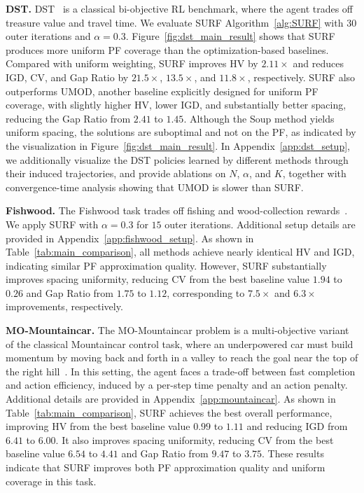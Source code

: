 \documentclass{article}
\begin{document}
\textbf{DST.}
DST~\citep{vamplew2011empirical,yahyaa2015thompson} is a classical bi-objective RL benchmark, where the agent trades off treasure value and travel time. 
We evaluate SURF Algorithm~\ref{alg:SURF} with $30$ outer iterations and $\alpha=0.3$. 
Figure~\ref{fig:dst_main_result} shows that SURF produces more uniform PF coverage than the optimization-based baselines. 
Compared with uniform weighting, SURF improves HV by $2.11\times$ and reduces IGD, CV, and Gap Ratio by $21.5\times$, $13.5\times$, and $11.8\times$, respectively. 
SURF also outperforms UMOD, another baseline explicitly designed for uniform PF coverage, with slightly higher HV, lower IGD, and substantially better spacing, reducing the Gap Ratio from $2.41$ to $1.45$. 
Although the Soup method yields uniform spacing,  the solutions are suboptimal and not on the PF, as indicated by the visualization in Figure~\ref{fig:dst_main_result}.
In Appendix~\ref{app:dst_setup}, we additionally visualize the DST policies learned by different methods through their induced trajectories, and provide ablations on $N$, $\alpha$, and $K$, together with convergence-time analysis showing that UMOD is slower than SURF.

\textbf{Fishwood.} The Fishwood task trades off fishing and wood-collection rewards~\citep{roijers2018multi}. We apply SURF with $\alpha=0.3$ for $15$ outer iterations. Additional setup details are provided in Appendix~\ref{app:fishwood_setup}.
As shown in Table~\ref{tab:main_comparison}, all methods achieve nearly identical HV and IGD, indicating similar PF approximation quality. 
However, SURF substantially improves spacing uniformity, reducing CV from the best baseline value $1.94$ to $0.26$ and Gap Ratio from $1.75$ to $1.12$, corresponding to $7.5\times$ and $6.3\times$ improvements, respectively.

\textbf{MO-Mountaincar.}
The MO-Mountaincar problem is a multi-objective variant of the classical Mountaincar control task, where an underpowered car must build momentum by moving back and forth in a valley to reach the goal near the top of the right hill~\citep{Moore90efficient}. In this setting, the agent faces a trade-off between fast completion and action efficiency, induced by a per-step time penalty and an action penalty. Additional details are provided in Appendix~\ref{app:mountaincar}.
As shown in Table~\ref{tab:main_comparison}, SURF achieves the best overall performance, improving HV from the best baseline value $0.99$ to $1.11$ and reducing IGD from $6.41$ to $6.00$.
It also improves spacing uniformity, reducing CV from the best baseline value $6.54$ to $4.41$ and Gap Ratio from $9.47$ to $3.75$.
These results indicate that SURF improves both PF approximation quality and uniform coverage in this task.
\end{document}
